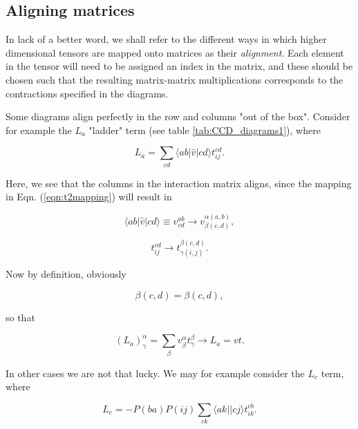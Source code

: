\subsection{Aligning matrices}

In lack of a better word, we shall refer to the different ways in which higher dimensional tensors are mapped onto matrices as their \emph{alignment}. Each element in the tensor will need to be assigned an index in the matrix, and these should be chosen such that the resulting matrix-matrix multiplications corresponds to the contractions specified in the diagrams.

Some diagrams align perfectly in the row and columns "out of the box". Consider for example the $L_a$ "ladder" term \cite{ShavittBartlett2009} (see table \ref{tab:CCD_diagrams1}), where

\begin{equation}
L_a = \sum_{cd} \langle a b \vert \hat{v}\vert c d \rangle t^{cd}_{ij}.
\label{eqn:L1diag}
\end{equation}

Here, we see that the columns in the interaction matrix aligns, since the mapping in Eqn. (\ref{eqn:t2mapping}) will result in 

\begin{equation}
 \langle a b \vert \hat{v}\vert c d \rangle \equiv v^{ab}_{cd}  \rightarrow v^{\alpha(a,b)}_{\beta(c,d)},
\end{equation}

\begin{equation}
t^{cd}_{ij}  \rightarrow t^{\beta(c,d)}_{\gamma(i,j)}.
\end{equation}

Now by definition, obviously 

\begin{equation}
\beta(c,d) = \beta(c,d),
\end{equation}

so that

\begin{equation}
(L_a)^{\alpha}_{\gamma} = \sum_{\beta} v^\alpha_\beta t^\beta_\gamma \rightarrow L_a = v t.
\label{eqn:L1diag_mapped}
\end{equation}

In other cases we are not that lucky. We may for example consider the $L_c$ term, where

\begin{equation}
L_c  = -P(ba)P(ij)  \sum_{ck} \langle ak \vert \vert cj \rangle t_{ik}^{cb}.
\end{equation}

